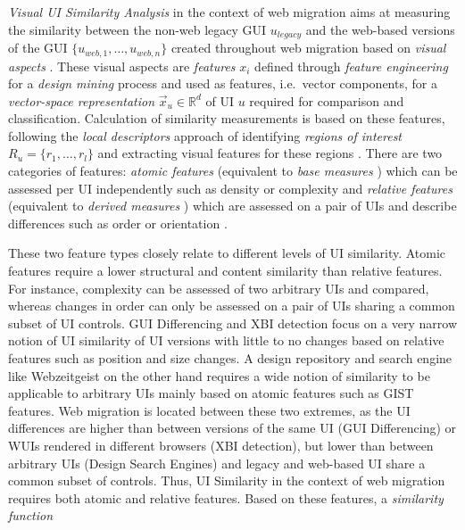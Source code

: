 \emph{Visual UI Similarity Analysis} in the context of web migration aims at measuring the similarity between the non-web legacy GUI \(u_{legacy}\) and the web-based versions of the GUI \(\{u_{web,1}, \ldots, u_{web,n}\}\) created throughout web migration based on \emph{visual aspects} \autocite{Heil2016Similarity,Bakaev2017Kansei}.
These visual aspects are \emph{features} \(x_i\) \autocite{Kumar2013Webzeitgeist} defined through \emph{feature engineering} for a \emph{design mining} \autocite{Bakaev2017WebIntelligence,Jahanian2017,Kumar2013Webzeitgeist} process \autocite{Bakaev2017WebIntelligence} and used as features, i.e.~vector components, for a \emph{vector-space representation} \(\vec x_u \in \mathbb{R}^d\) of UI \(u\) required for comparison and classification.
Calculation of similarity measurements is based on these features, following the \emph{local descriptors} approach of identifying \emph{regions of interest} \(R_u=\{r_1, \ldots, r_l\}\) and extracting visual features for these regions \autocite{Chechik2010OASIS}.
There are two categories of features: \emph{atomic features} (equivalent to \emph{base measures} \autocite{ISO/IEEE2017Measurement}) which can be assessed per UI independently such as density \autocite{Heil2016Similarity} or complexity \autocite{Bakaev2017Kansei} and \emph{relative features} (equivalent to \emph{derived measures} \autocite{ISO/IEEE2017Measurement}) which are assessed on a pair of UIs and describe differences such as order or orientation \autocite{Heil2016Similarity}.

These two feature types closely relate to different levels of UI similarity.
Atomic features require a lower structural and content similarity than relative features.
For instance, complexity can be assessed of two arbitrary UIs and compared, whereas changes in order can only be assessed on a pair of UIs sharing a common subset of UI controls.
GUI Differencing and XBI detection focus on a very narrow notion of UI similarity of UI versions with little to no changes based on relative features such as position and size changes.
A design repository and search engine like Webzeitgeist \autocite{Kumar2013Webzeitgeist} on the other hand requires a wide notion of similarity to be applicable to arbitrary UIs mainly based on atomic features such as GIST features.
Web migration is located between these two extremes, as the UI differences are higher than between versions of the same UI (GUI Differencing) or WUIs rendered in different browsers (XBI detection), but lower than between arbitrary UIs (Design Search Engines) and legacy and web-based UI share a common subset of controls.
Thus, UI Similarity in the context of web migration requires both atomic and relative features.
Based on these features, a \emph{similarity function}

